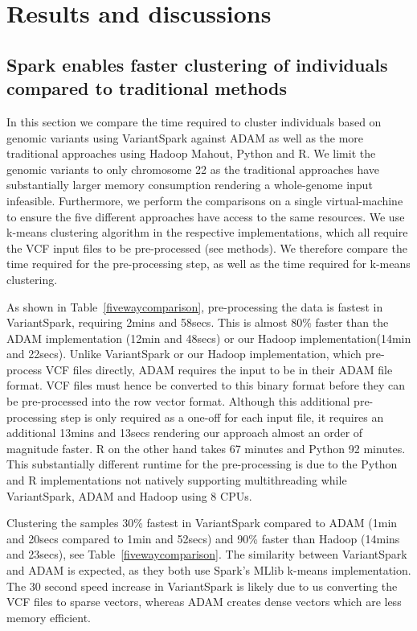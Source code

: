 \documentclass{bmcart}
\newcommand{\variantSpark}{{\sc VariantSpark}}
\begin{document}
\section*{Results and discussions}

\subsection*{{\sc Spark} enables faster clustering of individuals compared to traditional methods}

In this section we compare the time required to cluster individuals based on genomic variants using \variantSpark{} against ADAM as well as the more traditional approaches using Hadoop Mahout, Python and R. 
We limit the genomic variants to only chromosome 22 as the traditional approaches have substantially larger memory consumption rendering a whole-genome input infeasible.  
Furthermore, we perform the comparisons on a single virtual-machine to ensure the five different approaches have access to the same resources.
We use k-means clustering algorithm in the respective implementations, which all require the VCF input files to be pre-processed (see methods). 
We therefore compare the time required for the pre-processing step, as well as the time required for k-means clustering.

As shown in Table~\ref{fivewaycomparison}, pre-processing the data is fastest in \variantSpark{}, requiring 2mins and 58secs. %
This is almost 80\% faster than the ADAM implementation (12min and 48secs) %
or our Hadoop implementation(14min and 22secs). %
Unlike \variantSpark{} or our Hadoop implementation, which pre-process VCF files directly, ADAM requires the input to be in their ADAM file format. 
VCF files must hence be converted to this binary format before they can be pre-processed into the row vector format. 
Although this additional pre-processing step is only required as a one-off for each input file, it requires an additional 13mins and 13secs %
rendering our approach almost an order of magnitude faster. 
R on the other hand takes 67 minutes and Python 92 minutes.
This substantially different runtime for the pre-processing is due to the Python and R implementations not natively supporting multithreading while \variantSpark{}, ADAM and Hadoop using 8 CPUs.

Clustering the samples 30\% fastest in \variantSpark{} compared to ADAM (1min and 20secs compared to 1min and 52secs) and  %
90\% faster than Hadoop (14mins and 23secs), see Table~\ref{fivewaycomparison}.
The similarity between \variantSpark{} and ADAM is expected, as they both use {\sc Spark}'s MLlib k-means implementation. 
The 30 second speed increase in \variantSpark{} is likely due to us converting the VCF files to sparse vectors, whereas ADAM creates dense vectors which are less memory efficient.
\end{document}
